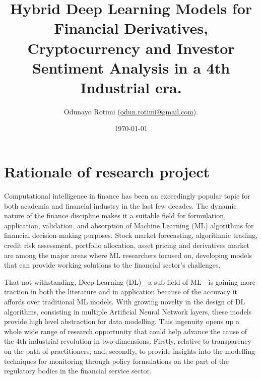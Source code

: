 \documentclass[a4paper,11pt]{scrartcl}
\title{Hybrid Deep Learning Models for Financial Derivatives, 
Cryptocurrency and Investor Sentiment Analysis in a 4th Industrial era.}
\author{Odunayo Rotimi (\url{odun.rotimi@gmail.com}).}
\date{\today}
\begin{document}
\maketitle


%
\section{Rationale of research project}
Computational intelligence in finance has been an exceedingly popular topic for both academia and financial
industry in the last few decades. The dynamic nature of the finance discipline makes it a suitable field for
formulation, application, validation, and absorption of Machine Learning (ML) algorithms for financial
decision-making purposes. Stock market forecasting, algorithmic trading, credit risk assessment,
portfolio allocation, asset pricing and derivatives market are among the major areas where ML researchers
focused on, developing models that can provide working solutions to the financial sector's challenges.
\newline

That not withstanding, Deep Learning (DL) - a sub-field of ML - is gaining more traction in both the
literature and in application because of the accuracy it affords over traditional ML models. With growing
novelty in the design of DL algorithms, consisting in multiple Artificial Neural Network layers, these models provide high level
abstraction for data modelling. This ingenuity opens up a whole wide range of research opportunity that
could help advance the cause of the 4th industrial revolution in two dimensions. Firstly, relative to
transparency on the path of practitioners; and, secondly, to provide insights into the modelling techniques
for monitoring through policy formulations on the part of the regulatory bodies in the financial service sector.


%
\end{document}
